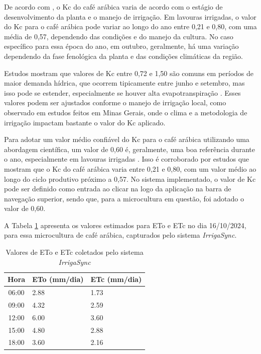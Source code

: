 De acordo com \textcite{rodrigues2013}, o Kc do café arábica varia de acordo com o estágio de desenvolvimento da planta e o manejo de irrigação. Em lavouras irrigadas, o valor do Kc para o café arábica pode variar ao longo do ano entre 0,21 e 0,80, com uma média de 0,57, dependendo das condições e do manejo da cultura.
No caso específico para essa época do ano, em outubro, geralmente, há uma variação dependendo da fase fenológica da planta e das condições climáticas da região. 

Estudos mostram que valores de Kc entre 0,72 e 1,50 são comuns em períodos de maior demanda hídrica, que ocorrem tipicamente entre junho e setembro, mas isso pode se estender, especialmente se houver alta evapotranspiração \parencite{souza2005}. Esses valores podem ser ajustados conforme o manejo de irrigação local, como observado em estudos feitos em Minas Gerais, onde o clima e a metodologia de irrigação impactam bastante o valor do Kc aplicado.

Para adotar um valor médio confiável do Kc para o café arábica utilizando uma abordagem científica, um valor de 0,60 é, geralmente, uma boa referência durante o ano, especialmente em lavouras irrigadas \parencite{rodrigues2013}. Isso é corroborado por estudos que mostram que o Kc do café arábica varia entre 0,21 e 0,80, com um valor médio ao longo do ciclo produtivo próximo a 0,57. No sistema implementado, o valor de Kc pode ser definido como entrada ao clicar na logo da aplicação na barra de navegação superior, sendo que, para a microcultura em questão, foi adotado o valor de 0,60.

A Tabela \ref{tab:et} apresenta os valores estimados para ETo e ETc no dia 16/10/2024, para essa microcultura de café arábica, capturados pelo sistema \textit{IrrigaSync}.

\begin{table}[!htb]
  \caption{Valores de ETo e ETc coletados pelo sistema \textit{IrrigaSync}} \label{tab:et}
  \begin{tabularx}{\textwidth}{|c|X|X|} \hline
    \textbf{Hora} & \textbf{ETo (mm/dia)} & \textbf{ETc (mm/dia)} \\ \hline
    06:00 & 2.88 & 1.73 \\ \hline
    09:00 & 4.32 & 2.59 \\ \hline
    12:00 & 6.00 & 3.60 \\ \hline
    15:00 & 4.80 & 2.88 \\ \hline
    18:00 & 3.60 & 2.16 \\ \hline
  \end{tabularx}
\end{table}

